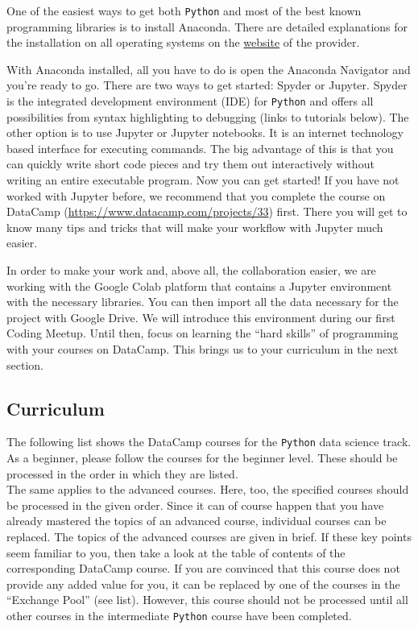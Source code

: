 \documentclass[
  11pt,
]{book}
\begin{document}
One of the easiest ways to get both \texttt{Python} and most of the best
known programming libraries is to install Anaconda. There are detailed
explanations for the installation on all operating systems on the
\href{https://docs.anaconda.com/anaconda/install/}{website} of the
provider.

With Anaconda installed, all you have to do is open the Anaconda
Navigator and you're ready to go. There are two ways to get started:
Spyder or Jupyter. Spyder is the integrated development environment
(IDE) for \texttt{Python} and offers all possibilities from syntax
highlighting to debugging (links to tutorials below). The other option
is to use Jupyter or Jupyter notebooks. It is an internet technology
based interface for executing commands. The big advantage of this is
that you can quickly write short code pieces and try them out
interactively without writing an entire executable program. Now you can
get started! If you have not worked with Jupyter before, we recommend
that you complete the course on DataCamp
(\url{https://www.datacamp.com/projects/33}) first. There you will get
to know many tips and tricks that will make your workflow with Jupyter
much easier.

In order to make your work and, above all, the collaboration easier, we
are working with the Google Colab platform that contains a Jupyter
environment with the necessary libraries. You can then import all the
data necessary for the project with Google Drive. We will introduce this
environment during our first Coding Meetup. Until then, focus on
learning the ``hard skills'' of programming with your courses on
DataCamp. This brings us to your curriculum in the next section.

\hypertarget{curriculum-1}{%
\subsection{Curriculum}\label{curriculum-1}}

The following list shows the DataCamp courses for the \texttt{Python}
data science track. As a beginner, please follow the courses for the
beginner level. These should be processed in the order in which they are
listed.\\
The same applies to the advanced courses. Here, too, the specified
courses should be processed in the given order. Since it can of course
happen that you have already mastered the topics of an advanced course,
individual courses can be replaced. The topics of the advanced courses
are given in brief. If these key points seem familiar to you, then take
a look at the table of contents of the corresponding DataCamp course. If
you are convinced that this course does not provide any added value for
you, it can be replaced by one of the courses in the ``Exchange Pool''
(see list). However, this course should not be processed until all other
courses in the intermediate \texttt{Python} course have been completed.
\end{document}
